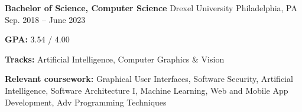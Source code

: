 \begin{cventries}
    \cventry
    {\textbf{Bachelor of Science, Computer Science}} %
    {Drexel University} %
    {Philadelphia, PA} %
    {Sep. 2018 -- June 2023} %
    {
      \begin{cvitems} %
        \item {\textbf{GPA:} 3.54 / 4.00}
        \item {\textbf{Tracks:} Artificial Intelligence, Computer Graphics \& Vision}
        \item {\color{darktext} \textbf{Relevant coursework:}
                    Graphical User Interfaces,
                    Software Security,
                    Artificial Intelligence,
                    Software Architecture I,
                    Machine Learning, 
                    Web and Mobile App Development,
                    Adv Programming Techniques
              }
      \end{cvitems}}

\end{cventries}
